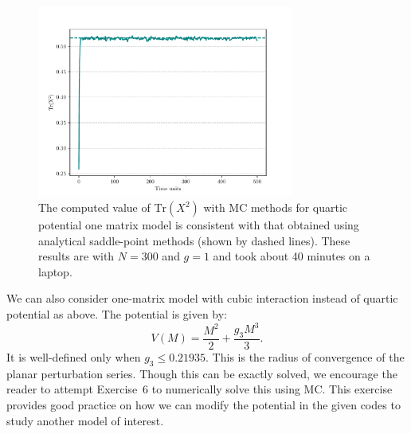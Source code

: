 \documentclass[letter,11pt]{article}
\begin{document}
\begin{figure}[htbp] 
	\centering 
	\includegraphics[width=0.75\textwidth]{figs/mm_plot.pdf}
	\caption{\label{fig:1MM_res}The computed value of $\mbox{Tr}(X^2)$ with MC methods for quartic potential
		one matrix model is consistent with that obtained using analytical saddle-point methods (shown by dashed lines). 
		These results are with $N = 300$ and $g = 1$ and took about 40 minutes on a laptop.}
\end{figure}
We can also consider one-matrix model with cubic interaction instead of quartic potential as above. 
The potential is given by:
\begin{equation}
	V(M) = \frac{M^2}{2} + \frac{g_{3}M^3}{3}.  
\end{equation}
It is well-defined only when $g_{3} \le 0.21935$. This is the radius of convergence of the planar perturbation series. 
Though this can be exactly solved, we encourage the reader to attempt Exercise~6 to numerically solve this using MC. This exercise provides good practice on how we can modify the potential in the given codes to study another model of interest. 
\end{document}
